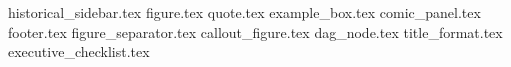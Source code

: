 {historical_sidebar.tex}
{figure.tex}
{quote.tex}
{example_box.tex}
{comic_panel.tex}
{footer.tex}
{figure_separator.tex}
{callout_figure.tex}
{dag_node.tex}
{title_format.tex}
{executive_checklist.tex}
